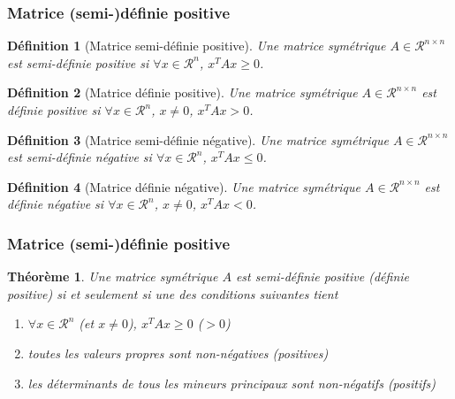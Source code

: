 \documentclass[usepdftitle=false]{beamer}
\newtheorem{defn}{Définition}
\newtheorem{thm}{Théorème}
\def\cR{\mathcal{R}}
\begin{document}
\begin{frame}
\frametitle{Matrice (semi-)définie positive}

\begin{defn}[Matrice semi-définie positive]
Une matrice symétrique $A \in \cR^{n \times n}$ est semi-définie positive si $\forall x \in \cR^n$, $x^TAx \geq 0$.
\end{defn}

\begin{defn}[Matrice définie positive]
Une matrice symétrique  $A \in \cR^{n \times n}$ est définie positive si $\forall x \in \cR^n$, $x \ne 0$, $x^TAx > 0$.
\end{defn}

\begin{defn}[Matrice semi-définie négative]
	Une matrice symétrique  $A \in \cR^{n \times n}$ est semi-définie négative si $\forall x \in \cR^n$, $x^TAx \leq 0$.
\end{defn}

\begin{defn}[Matrice définie négative]
	Une matrice symétrique  $A \in \cR^{n \times n}$ est définie négative si $\forall x \in \cR^n$, $x \ne 0$, $x^TAx < 0$.
\end{defn}

\end{frame}

\begin{frame}
\frametitle{Matrice (semi-)définie positive}

\begin{thm}
Une matrice symétrique  $A$ est semi-définie positive (définie positive) si et seulement si une des conditions suivantes tient
\begin{enumerate}
\item
$\forall x \in \cR^n$ (et $x \ne 0$), $x^TAx \geq 0$ ($> 0$)
\item
toutes les valeurs propres sont non-négatives (positives)
\item
les déterminants de tous les mineurs principaux sont non-négatifs (positifs)
\end{enumerate}
\end{thm}

\end{frame}
\end{document}
